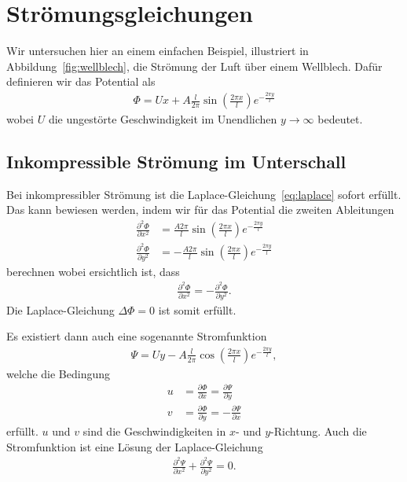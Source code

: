 %
%
%
\section{Strömungsgleichungen\label{ueberschall:stroemungsgleichung}}
Wir untersuchen hier an einem einfachen Beispiel, 
illustriert in Abbildung~\ref{fig:wellblech},
die Strömung der Luft über einem Wellblech.
Dafür definieren wir das Potential als
\begin{align*}
    \Phi
    =
    U x + A \frac{l}{2 \pi} \sin\left(\frac{2 \pi x}{l}\right)
    e^{-\frac{2 \pi y}{l}}
\end{align*}
wobei $U$ die ungestörte Geschwindigkeit im 
Unendlichen $y\rightarrow\infty$ bedeutet.


\subsection{Inkompressible Strömung im Unterschall}
Bei inkompressibler Strömung ist die
Laplace-Gleichung~\eqref{eq:laplace} sofort erfüllt.
Das kann bewiesen werden, indem wir für das Potential
die zweiten Ableitungen
\begin{align*}
    \frac{\partial^2 \Phi}{\partial x^2}
    &= \frac{A 2 \pi}{l} \sin\left(\frac{2 \pi x}{l}\right)
    e^{-\frac{2 \pi y}{l}} \\
    \frac{\partial^2 \Phi}{\partial y^2}
    &= -\frac{A 2 \pi}{l} \sin\left(\frac{2 \pi x}{l}\right)
     e^{-\frac{2 \pi y}{l}}
\end{align*}
berechnen wobei ersichtlich ist, dass
\begin{align*}
    \frac{\partial^2 \Phi}{\partial x^2}
    =
    -\frac{\partial^2 \Phi}{\partial y^2}.
\end{align*}
Die Laplace-Gleichung $\Delta \Phi = 0$ ist somit erfüllt.

Es existiert dann auch eine sogenannte Stromfunktion
\begin{align*}
    \Psi
    =
    U y - A \frac{l}{2 \pi} \cos\left(\frac{2 \pi x}{l}\right)
     e^{-\frac{2 \pi y}{l}},
\end{align*}
welche die Bedingung
\begin{align*}
    u 
    &=
    \frac{\partial \Phi}{\partial x}
    =
    \frac{\partial \Psi}{\partial y}
    \\
    v
    &=
    \frac{\partial \Phi}{\partial y}
    =
    -\frac{\partial \Psi}{\partial x}
\end{align*}
erfüllt.
$u$ und $v$ sind die Geschwindigkeiten in $x$- und $y$-Richtung.
Auch die Stromfunktion ist eine Lösung der Laplace-Gleichung
\begin{align*}
    \frac{\partial^2 \Psi}{\partial x^2}
    +
    \frac{\partial^2 \Psi}{\partial y^2}
    =
    0.
\end{align*}

